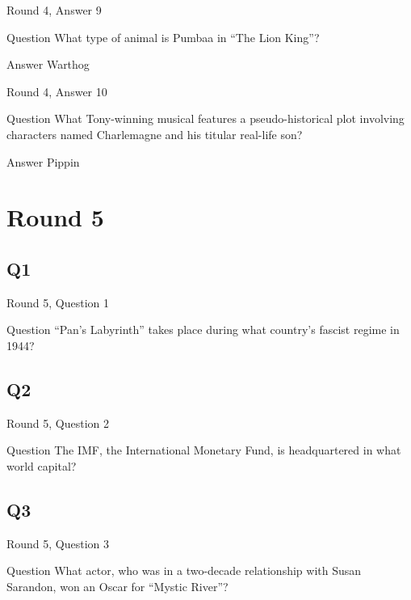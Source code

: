 \documentclass[11pt]{beamer}
\begin{document}
\begin{frame}[t]{Round 4, Answer 9}
\vspace{2em}
\begin{block}{Question}
What type of animal is Pumbaa in ``The Lion King''\@?
\end{block}
\pause{}
\begin{block}{Answer}
Warthog
\end{block}
\end{frame}
    

\begin{frame}[t]{Round 4, Answer 10}
\vspace{2em}
\begin{block}{Question}
What Tony-winning musical features a pseudo-historical plot involving characters named Charlemagne and his titular real-life son\@?
\end{block}
\pause{}
\begin{block}{Answer}
Pippin
\end{block}
\end{frame}
    

\section{Round 5}
    

\subsection*{Q1}
\begin{frame}[t]{Round 5, Question 1}
\vspace{2em}
\begin{block}{Question}
``Pan's Labyrinth'' takes place during what country's fascist regime in 1944\@?
\end{block}
\end{frame}
    

\subsection*{Q2}
\begin{frame}[t]{Round 5, Question 2}
\vspace{2em}
\begin{block}{Question}
The IMF, the International Monetary Fund, is headquartered in what world capital\@?
\end{block}
\end{frame}
    

\subsection*{Q3}
\begin{frame}[t]{Round 5, Question 3}
\vspace{2em}
\begin{block}{Question}
What actor, who was in a two-decade relationship with Susan Sarandon, won an Oscar for ``Mystic River''\@?
\end{block}
\end{frame}
    
\end{document}
